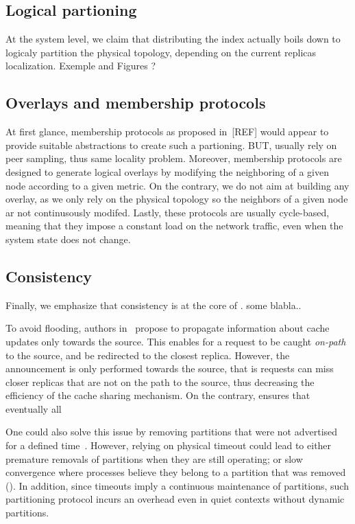 \subsection*{Logical partioning}
At the system level, we claim that distributing the index actually boils down to logicaly partition the physical topology, depending on the current replicas localization. 
Exemple and Figures ?

\subsection*{Overlays and membership protocols}
At first glance, membership protocols as proposed in~\cite{t-man}[REF] would appear to provide suitable abstractions to create such a partioning. 
BUT, usually rely on peer sampling, thus same locality problem.
Moreover, membership protocols are designed to generate logical overlays by modifying the neighboring of a given node according to a given metric. 
On the contrary, we do not aim at building any overlay, as we only rely on the physical topology so the neighbors of a given node ar not continusously modifed. 
Lastly, these protocols are usually cycle-based, meaning that they impose a constant load on the network traffic, even when the system state does not change.

\subsection*{Consistency}
Finally, we emphasize that consistency is at the core of \NAME. some blabla..

To avoid flooding, authors in~\cite{opnl} propose to propagate information about cache updates only towards the source. This enables for a request to be caught \textit{on-path} to the source, and be redirected to the closest replica. However, the announcement is only performed towards the source, that is requests can miss closer replicas that are not on the path to the source, thus decreasing the efficiency of the cache sharing mechanism. On the contrary, \NAME ensures that eventually all 

One could also solve this issue by removing partitions that were not advertised for a defined time~\cite{hemmati2015namebased, garcia-lopez}.  
However, relying on physical timeout could lead to either premature removals of partitions when they are still operating; or slow convergence where processes believe they belong to a partition that was removed (). In addition, since timeouts imply a
continuous maintenance of partitions, such partitioning protocol
incurs an overhead even in quiet contexts without dynamic partitions.


